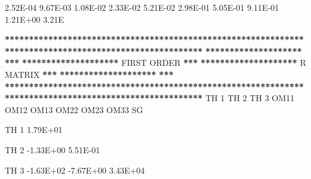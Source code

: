 \documentclass[
  11pt,
  krantz2, a4paper, twoside]{krantz}
\newenvironment{Shaded}{\begin{snugshade}}{\end{snugshade}}
\newcommand{\DecValTok}[1]{\textcolor[rgb]{0.00,0.00,0.81}{#1}}
\newcommand{\ErrorTok}[1]{\textcolor[rgb]{0.64,0.00,0.00}{\textbf{#1}}}
\newcommand{\FloatTok}[1]{\textcolor[rgb]{0.00,0.00,0.81}{#1}}
\newcommand{\NormalTok}[1]{#1}
\newcommand{\OperatorTok}[1]{\textcolor[rgb]{0.81,0.36,0.00}{\textbf{#1}}}
\newcommand{\StringTok}[1]{\textcolor[rgb]{0.31,0.60,0.02}{#1}}
\theoremstyle{definition}
\theoremstyle{definition}
\theoremstyle{definition}
\theoremstyle{remark}
\begin{document}
\begin{Shaded}
\begin{Highlighting}[]
        \FloatTok{2.52E{-}04}  \FloatTok{9.67E{-}03}  \FloatTok{1.08E{-}02}  \FloatTok{2.33E{-}02}  \FloatTok{5.21E{-}02}  \FloatTok{2.98E{-}01}  \FloatTok{5.05E{-}01}  \FloatTok{9.11E{-}01}  \FloatTok{1.21E+00}  \FloatTok{3.21}\NormalTok{E}
                                                                                                       
                                                                                                       
\OperatorTok{**}\ErrorTok{*****************************************************************************************************}
\ErrorTok{********************}\StringTok{                                                                                }\ErrorTok{***}
\ErrorTok{********************}\StringTok{                                   }\NormalTok{FIRST ORDER                                  }\OperatorTok{**}\ErrorTok{*}
\ErrorTok{********************}\StringTok{                                     }\NormalTok{R MATRIX                                   }\OperatorTok{**}\ErrorTok{*}
\ErrorTok{********************}\StringTok{                                                                                }\ErrorTok{***}
\ErrorTok{*******************************************************************************************************}
\StringTok{                                                                                                       }
\StringTok{                                                                                                       }
\StringTok{           }\NormalTok{TH }\DecValTok{1}\NormalTok{      TH }\DecValTok{2}\NormalTok{      TH }\DecValTok{3}\NormalTok{      OM11      OM12      OM13      OM22      OM23      OM33      SG}
                                                                                                       
                                                                                                       
\NormalTok{TH }\DecValTok{1}    \FloatTok{1.79E+01}                                                                                       
                                                                                                       
\NormalTok{TH }\DecValTok{2}   \FloatTok{{-}1.33E+00}  \FloatTok{5.51E{-}01}                                                                             
                                                                                                       
\NormalTok{TH }\DecValTok{3}   \FloatTok{{-}1.63E+02} \FloatTok{{-}7.67E+00}  \FloatTok{3.43E+04}                                                                   
                                                                                                       

\end{Highlighting}
\end{Shaded}
\end{document}
